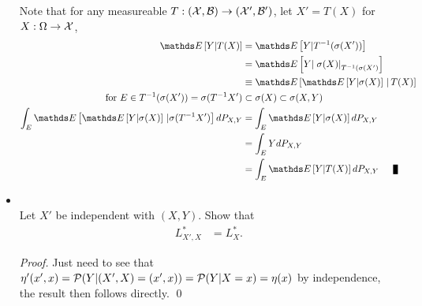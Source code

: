 \documentclass[11pt]{article}
\begin{document}
\begin{itemize}
\begin{remark}
Note that for any measureable $T: ({\mathcal X}, {\mathcal B}) \rightarrow ({\mathcal X}', {\mathcal B}')$, let $X'= T(X)$ for $X: \Omega \rightarrow {\mathcal X}$,
\begin{align*}
\E{}{Y| T(X)} &= \E{}{Y| T^{-1}(\sigma(X'))}\\
&= \E{}{Y| \rlat{\sigma(X)}{T^{-1}(\sigma(X')}}\\
& \equiv \E{}{\E{}{Y|\sigma(X)}\,|\,T(X)} \\
\text{for } E\in T^{-1}(\sigma(X'))= \sigma(T^{-1}X') &\subset \sigma(X) \subset \sigma(X,Y) \\
 \int_{E} \E{}{\E{}{Y|\sigma(X)}\,|\sigma(T^{-1}X')}dP_{X,Y}& = \int_{E} \E{}{Y|\sigma(X)} dP_{X,Y}  \\
 &= \int_{E}Y dP_{X,Y}\\
 &= \int_{E} \E{}{Y| T(X)} dP_{X,Y} \qed
\end{align*} 
\end{remark}

\item \begin{exercise}\citep{devroye2013probabilistic}\\
Let $X'$ be independent with $(X,Y)$. Show that 
\begin{align*}
L_{X', X}^{*} &= L_{X}^{*}.
\end{align*}
\end{exercise}
\begin{proof}
Just need to see that $\eta'(x',x) = {\mathcal P}(Y| (X', X)= (x' , x)) = {\mathcal P}(Y| X=x)= \eta(x)$ by independence, the result then follows directly. \qed
\end{proof}
\end{itemize}
\end{document}
